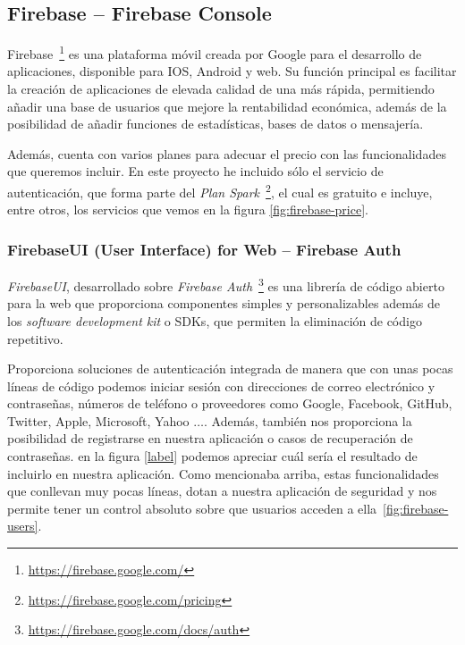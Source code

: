 \subsection{Firebase -- Firebase Console}
Firebase~\footnote{\url{https://firebase.google.com/}} es una plataforma móvil creada por Google para el desarrollo de aplicaciones, disponible para IOS, Android y web. Su función principal es facilitar la creación de aplicaciones de elevada calidad de una más rápida, permitiendo añadir una base de usuarios que mejore la rentabilidad económica, además de la posibilidad de añadir funciones de estadísticas, bases de datos o mensajería.


Además, cuenta con varios planes para adecuar el precio con las funcionalidades que queremos incluir. En este proyecto he incluido sólo el servicio de autenticación, que forma parte del \textit{Plan Spark}~\footnote{\url{https://firebase.google.com/pricing}}, el cual es gratuito e incluye, entre otros, los servicios que vemos en la figura \ref{fig:firebase-price}.



\subsubsection{FirebaseUI (User Interface) for Web -- Firebase Auth}
\textit{FirebaseUI}, desarrollado sobre \textit{Firebase Auth}~\footnote{\url{https://firebase.google.com/docs/auth}} es una librería de código abierto para la web que proporciona componentes simples y personalizables además de los \textit{software development kit} o SDKs, que permiten la eliminación de código repetitivo.


Proporciona soluciones de autenticación integrada de manera que con unas pocas líneas de código podemos iniciar sesión con direcciones de correo electrónico y contraseñas, números de teléfono o proveedores como Google, Facebook, GitHub, Twitter, Apple, Microsoft, Yahoo $\dots$. Además, también nos proporciona la posibilidad de registrarse en nuestra aplicación o casos de recuperación de contraseñas. en la figura \ref{label} podemos apreciar cuál sería el resultado de incluirlo en nuestra aplicación.
Como mencionaba arriba, estas funcionalidades que conllevan muy pocas líneas, dotan a nuestra aplicación de seguridad y nos permite tener un control absoluto sobre que usuarios acceden a ella~\ref{fig:firebase-users}.



